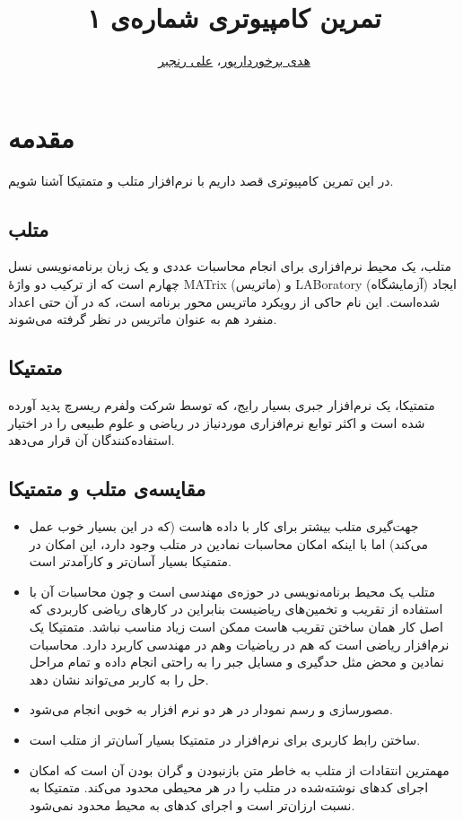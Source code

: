\documentclass{utsignal}
\title{تمرین کامپیوتری شماره‌ی ۱}
\author{\href{mailto:hodabpour@gmail.com?subject=[SS\%20S98 A1]}{هدی برخوردارپور}، 
\href{mailto:ranjbar.ali@ut.ac.ir?subject=[SS\%20S98 A1]\%20}{علی رنجبر}}
\begin{document}
    \maketitle
    \section{مقدمه}
        در این تمرین کامپیوتری قصد داریم با نرم‌افزار ‌‌متلب  و متمتیکا آشنا شویم.
    \subsection{متلب}
 متلب، یک محیط نرم‌افزاری برای انجام محاسبات عددی و یک زبان برنامه‌نویسی نسل چهارم است که از ترکیب دو واژهٔ MATrix (ماتریس) و LABoratory (آزمایشگاه) ایجاد شده‌است.  این نام حاکی از رویکرد ماتریس محور برنامه است، که در آن حتی اعداد منفرد هم به عنوان ماتریس در نظر گرفته می‌شوند.
    \subsection{متمتیکا}
    متمتیکا، یک نرم‌افزار جبری بسیار رایج، که توسط شرکت ولفرم ریسرچ پدید آورده شده است و اکثر توابع نرم‌افزاری موردنیاز در ریاضی و علوم طبیعی را در اختیار استفاده‌کنندگان آن قرار می‌دهد.
    \subsection{مقایسه‌ی متلب و متمتیکا}
    \begin{itemize}
        \item جهت‌گیری متلب بیشتر برای کار با داده هاست (که در این بسیار خوب عمل می‌کند) اما با اینکه امکان محاسبات نمادین در‌ متلب وجود دارد، این امکان در متمتیکا بسیار آسان‌تر و کارآمدتر است. 
        \item متلب یک محیط برنامه‌نویسی در حوزه‌ی مهندسی است و چون محاسبات آن با استفاده از تقریب و تخمین‌های ریاضیست بنابراین در کارهای ریاضی کاربردی که اصل کار همان ساختن تقریب هاست ممکن است زیاد مناسب نباشد. 
    متمتیکا یک نرم‌افزار ریاضی است که هم در ریاضیات وهم در مهندسی کاربرد دارد. محاسبات نمادین و محض مثل حدگیری و مسایل جبر را به راحتی انجام داده و تمام مراحل حل را به کاربر می‌تواند نشان دهد.
    
    \item مصورسازی و رسم نمودار در هر دو نرم افزار به خوبی انجام می‌شود.
    
    \item ساختن رابط کاربری برای نرم‌افزار در متمتیکا بسیار آسان‌تر از متلب است.
    \item مهمترین انتقادات از متلب به خاطر متن بازنبودن و گران بودن آن است که امکان اجرای کدهای نوشته‌شده در متلب را در هر محیطی محدود می‌کند. متمتیکا به نسبت ارزان‌تر است و اجرای کدهای به محیط محدود نمی‌شود.
    
	\end{itemize}
\end{document}
